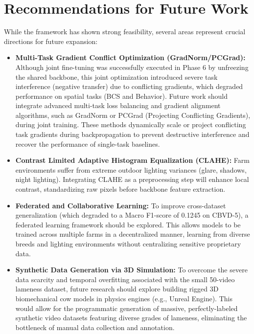 \section{Recommendations for Future Work}
While the framework has shown strong feasibility, several areas represent crucial directions for future expansion:
\begin{itemize}
    \item \textbf{Multi-Task Gradient Conflict Optimization (GradNorm/PCGrad):} Although joint fine-tuning was successfully executed in Phase 6 by unfreezing the shared backbone, this joint optimization introduced severe task interference (negative transfer) due to conflicting gradients, which degraded performance on spatial tasks (BCS and Behavior). Future work should integrate advanced multi-task loss balancing and gradient alignment algorithms, such as GradNorm or PCGrad (Projecting Conflicting Gradients), during joint training. These methods dynamically scale or project conflicting task gradients during backpropagation to prevent destructive interference and recover the performance of single-task baselines.
    \item \textbf{Contrast Limited Adaptive Histogram Equalization (CLAHE):} Farm environments suffer from extreme outdoor lighting variances (glare, shadows, night lighting). Integrating CLAHE as a preprocessing step will enhance local contrast, standardizing raw pixels before backbone feature extraction.
    \item \textbf{Federated and Collaborative Learning:} To improve cross-dataset generalization (which degraded to a Macro F1-score of 0.1245 on CBVD-5), a federated learning framework should be explored. This allows models to be trained across multiple farms in a decentralized manner, learning from diverse breeds and lighting environments without centralizing sensitive proprietary data.
    \item \textbf{Synthetic Data Generation via 3D Simulation:} To overcome the severe data scarcity and temporal overfitting associated with the small 50-video lameness dataset, future research should explore building rigged 3D biomechanical cow models in physics engines (e.g., Unreal Engine). This would allow for the programmatic generation of massive, perfectly-labeled synthetic video datasets featuring diverse grades of lameness, eliminating the bottleneck of manual data collection and annotation.
\end{itemize}
